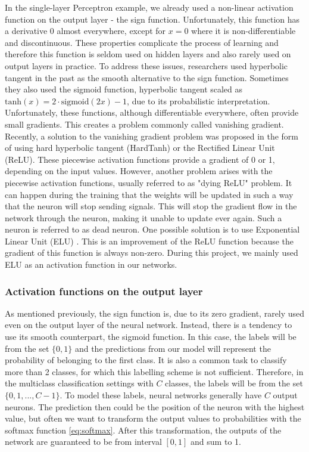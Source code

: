 In the single-layer Perceptron example, we already used a non-linear activation function on the output layer - the sign function.
Unfortunately, this function has a derivative 0 almost everywhere, except for $x=0$ where it is non-differentiable and discontinuous.
These properties complicate the process of learning and therefore this function is seldom used on hidden layers and also rarely used on output layers in practice.
To address these issues, researchers used hyperbolic tangent in the past as the smooth alternative to the sign function. 
Sometimes they also used the sigmoid function, hyperbolic tangent scaled as $\text{tanh}(x) = 2 \cdot \text{sigmoid}(2x) - 1$, due to its probabilistic interpretation.
Unfortunately, these functions, although differentiable everywhere, often provide small gradients.
This creates a problem commonly called vanishing gradient.
Recently, a solution to the vanishing gradient problem was proposed in the form of using hard hyperbolic tangent (HardTanh) or the Rectified Linear Unit (ReLU).
These piecewise activation functions provide a gradient of 0 or 1, depending on the input values.
However, another problem arises with the piecewise activation functions, usually referred to as "dying ReLU" problem.
It can happen during the training that the weights will be updated in such a way that the neuron will stop sending signals.
This will stop the gradient flow in the network through the neuron, making it unable to update ever again.
Such a neuron is referred to as dead neuron.
One possible solution is to use Exponential Linear Unit (ELU) \cite{clevert2015fast}.
This is an improvement of the ReLU function because the gradient of this function is always non-zero.
During this project, we mainly used ELU as an activation function in our networks.
\cite{activations}

\subsubsection{Activation functions on the output layer}
As mentioned previously, the sign function is, due to its zero gradient, rarely used even on the output layer of the neural network.
Instead, there is a tendency to use its smooth counterpart, the sigmoid function.
In this case, the labels will be from the set $\{0, 1\}$ and the predictions from our model will represent the probability of belonging to the first class.
It is also a common task to classify more than 2 classes, for which this labelling scheme is not sufficient.
Therefore, in the multiclass classification settings with $C$ classes, the labels will be from the set $\{0, 1, ..., C-1\}$.
To model these labels, neural networks generally have $C$ output neurons.
The prediction then could be the position of the neuron with the highest value, but often we want to transform the output values to probabilities with the softmax function \ref{eq:softmax}.
After this transformation, the outputs of the network are guaranteed to be from interval $[0, 1]$ and sum to 1.

